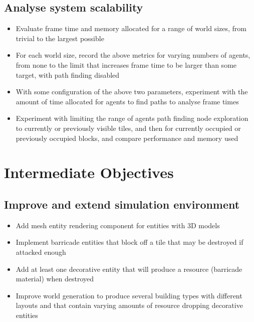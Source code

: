 \documentclass[a4paper,11pt]{article}
\begin{document}
\subsection{Analyse system scalability}
    \begin{itemize}
    \item Evaluate frame time and memory allocated for a range of world
        sizes, from trivial to the largest possible
    \item For each world size, record the above metrics for varying numbers
        of agents, from none to the limit that increases frame time to be
        larger than some target, with path finding disabled
    \item With some configuration of the above two parameters, experiment
        with the amount of time allocated for agents to find paths to
        analyse frame times
    \item Experiment with limiting the range of agents path finding node
        exploration to currently or previously visible tiles, and then
        for currently occupied or previously occupied blocks, and compare
        performance and memory used
    \end{itemize}

\section{Intermediate Objectives}
\subsection{Improve and extend simulation environment}
    \begin{itemize}
    \item Add mesh entity rendering component for entities with 3D models
    \item Implement barricade entities that block off a tile that may be
        destroyed if attacked enough
    \item Add at least one decorative entity that will produce a resource
        (barricade material) when destroyed
    \item Improve world generation to produce several building types with
        different layouts and that contain varying amounts of resource
        dropping decorative entities
    \end{itemize}
\end{document}
